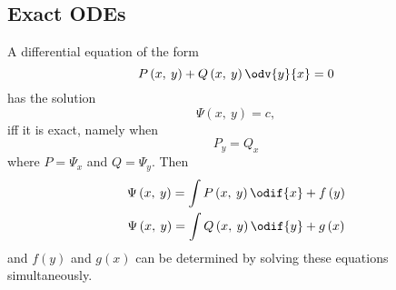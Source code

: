 \documentclass{article}
\begin{document}
\subsection{Exact ODEs}
A differential equation of the form
\begin{equation*}
    P\left( x,\: y \right) + Q\left( x,\: y \right) \odv{y}{x} = 0
\end{equation*}
has the solution
\begin{equation*}
    \Psi\left( x,\: y \right) = c,
\end{equation*}
iff it is exact, namely when
\begin{equation*}
    P_y = Q_x
\end{equation*}
where \(P = \Psi_x\) and \(Q = \Psi_y\). Then
\begin{gather*}
    \Psi\left( x,\: y \right) = \int P\left( x,\: y \right) \odif{x} + f\left( y \right) \\
    \Psi\left( x,\: y \right) = \int Q\left( x,\: y \right) \odif{y} + g\left( x \right)
\end{gather*}
and \(f\left( y \right)\) and \(g\left( x \right)\) can be determined by solving these equations
simultaneously.
\newpage
\end{document}
